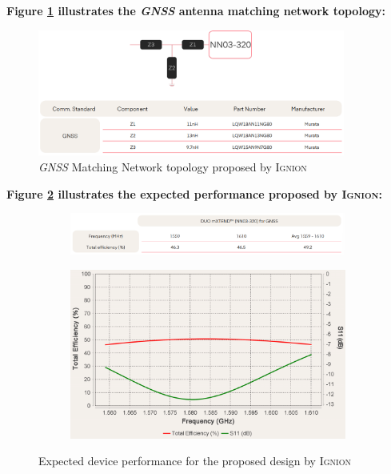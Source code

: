 \documentclass[report.tex]{subfiles}
\begin{document}
\textbf{Figure \ref{fig:gnss_antenna} illustrates the \textit{GNSS} antenna matching network topology:}

\begin{figure}[H]
	\centering
	\includegraphics[width=0.9\textwidth]{Include/Figure/antenna/ignion_gnss.png}
	\caption{\textit{GNSS} Matching Network topology proposed by \textsc{Ignion}}
	\label{fig:gnss_antenna}
\end{figure}

\textbf{Figure \ref{fig:ignion_gnss_perf} illustrates the expected performance proposed by \textsc{Ignion}:}

\begin{figure}[H]
\centering
\begin{subfigure}{1\textwidth}
	\centering
	\includegraphics[width=1\textwidth]{Include/Figure/antenna/ignion_gnss_perf_2.png}
\end{subfigure}
\begin{subfigure}{0.75\textwidth}
	\centering
	\includegraphics[width=1\textwidth]{Include/Figure/antenna/ignion_gnss_perf.png}
\end{subfigure}
	\caption{Expected device performance for the proposed design by \textsc{Ignion}}
	\label{fig:ignion_gnss_perf}
\end{figure}
\end{document}
